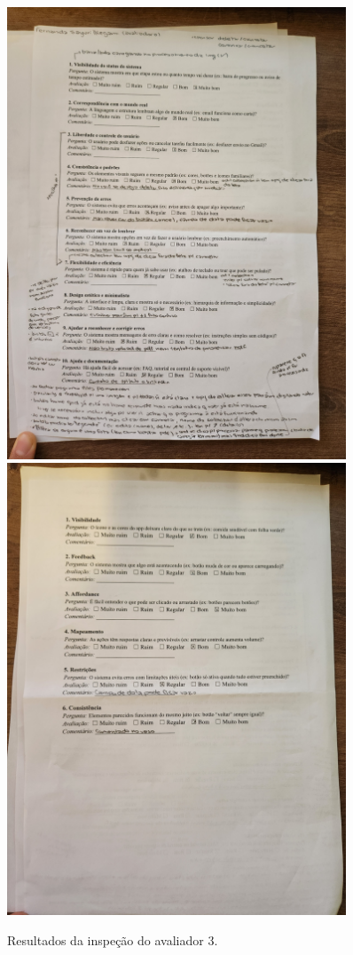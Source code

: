 \begin{figure}[H]
    \centering
    \includegraphics[width=0.9\textwidth]{sections/appendix/resultados_inspecao_usabilidade/3 (1).jpg}
    \includegraphics[width=0.9\textwidth]{sections/appendix/resultados_inspecao_usabilidade/3 (2).jpg}
    \caption{Resultados da inspeção do avaliador 3.}
\end{figure}

